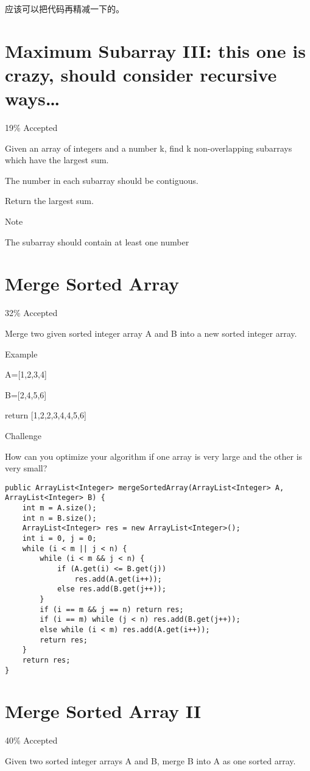 \documentclass[9pt, b5paaper]{book}
\begin{document}
应该可以把代码再精减一下的。
\section{Maximum Subarray III: this one is crazy, should consider recursive ways\ldots{}}
\label{sec-1-42}

19\% Accepted

Given an array of integers and a number k, find k non-overlapping subarrays which have the largest sum.

The number in each subarray should be contiguous.

Return the largest sum.

Note

The subarray should contain at least one number
\section{Merge Sorted Array}
\label{sec-1-43}

32\% Accepted

Merge two given sorted integer array A and B into a new sorted integer array.

Example

A=[1,2,3,4]

B=[2,4,5,6]

return [1,2,2,3,4,4,5,6]

Challenge

How can you optimize your algorithm if one array is very large and the other is very small?
\begin{verbatim}
public ArrayList<Integer> mergeSortedArray(ArrayList<Integer> A, ArrayList<Integer> B) {
    int m = A.size();
    int n = B.size();
    ArrayList<Integer> res = new ArrayList<Integer>();
    int i = 0, j = 0;
    while (i < m || j < n) {
        while (i < m && j < n) {
            if (A.get(i) <= B.get(j)) 
                res.add(A.get(i++));
            else res.add(B.get(j++));
        }
        if (i == m && j == n) return res;
        if (i == m) while (j < n) res.add(B.get(j++));
        else while (i < m) res.add(A.get(i++));
        return res;
    }
    return res;
}
\end{verbatim}
\section{Merge Sorted Array II}
\label{sec-1-44}

40\% Accepted

Given two sorted integer arrays A and B, merge B into A as one sorted array.
\end{document}
